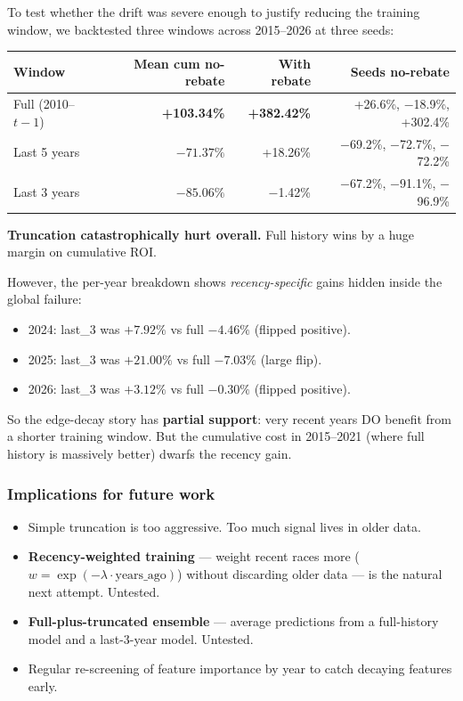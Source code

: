 \documentclass[11pt]{article}
\begin{document}
To test whether the drift was severe enough to justify reducing the
training window, we backtested three windows across 2015--2026 at
three seeds:

\begin{center}
\begin{tabular}{lrrr}
\toprule
Window & Mean cum no-rebate & With rebate & Seeds no-rebate \\
\midrule
Full (2010--$t{-}1$) & \textbf{+103.34\%} & \textbf{+382.42\%} & +26.6\%, $-$18.9\%, +302.4\% \\
Last 5 years & $-71.37\%$ & +18.26\% & $-$69.2\%, $-$72.7\%, $-$72.2\% \\
Last 3 years & $-85.06\%$ & $-$1.42\%  & $-$67.2\%, $-$91.1\%, $-$96.9\% \\
\bottomrule
\end{tabular}
\end{center}

\textbf{Truncation catastrophically hurt overall.} Full history wins by
a huge margin on cumulative ROI.

However, the per-year breakdown shows \emph{recency-specific} gains
hidden inside the global failure:
\begin{itemize}\item 2024: last\_3 was $+7.92\%$ vs full $-4.46\%$ (flipped positive).
\item 2025: last\_3 was $+21.00\%$ vs full $-7.03\%$ (large flip).
\item 2026: last\_3 was $+3.12\%$ vs full $-0.30\%$ (flipped positive).
\end{itemize}

So the edge-decay story has \textbf{partial support}: very recent
years DO benefit from a shorter training window. But the cumulative
cost in 2015--2021 (where full history is massively better) dwarfs the
recency gain.

\subsubsection*{Implications for future work}

\begin{itemize}\item Simple truncation is too aggressive. Too much signal lives in
      older data.
\item \textbf{Recency-weighted training} --- weight recent races more
      ($w = \exp(-\lambda \cdot \text{years\_ago})$) without discarding
      older data --- is the natural next attempt. Untested.
\item \textbf{Full-plus-truncated ensemble} --- average predictions from
      a full-history model and a last-3-year model. Untested.
\item Regular re-screening of feature importance by year to catch
      decaying features early.
\end{itemize}
\end{document}
